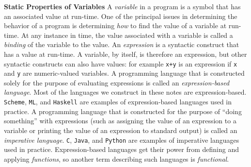 \begin{minipage}[t]{\sw}
\slidenumber
\LARGE
{\bf Static Properties of Variables}\exx
A {\em variable} in a program is a symbol
that has an associated value at run-time.
One of the principal issues in determining the behavior of a program
is determining {\em how} to find the value of a variable at run-time.
At any instance in time, the value associated with a variable
is called a {\em binding} of the variable to the value.\exx
An {\em expression} is a syntactic construct that has a value at run-time.
A variable, by itself, is therefore an expression,
but other syntactic constructs can also have values:
for example \verb'x+y' is an expression
if \verb'x' and \verb'y' are numeric-valued variables.\exx
A programming language that is constructed solely for the purpose
of evaluating expressions is called an {\em expression-based language}.
Most of the languages we construct in these notes are expression-based.
\verb'Scheme', \verb'ML', and \verb'Haskell' are examples
of expression-based languages used in practice.
A programming language that is constructed for the purpose of
``doing something'' with expressions
(such as assigning the value of an expression to a variable
or printing the value of an expression to standard output)
is called an {\em imperative language}.
\verb'C', \verb'Java', and \verb'Python' are examples
of imperative languages used in practice.\exx
Expression-based languages get their power
from defining and applying {\em functions},
so another term describing such languages is {\em functional}.

\end{minipage}
\clearpage
